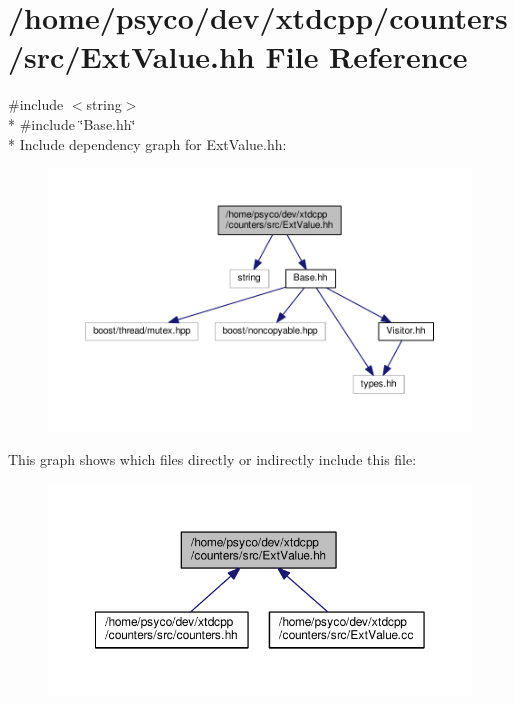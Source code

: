 \hypertarget{ExtValue_8hh}{}\section{/home/psyco/dev/xtdcpp/counters/src/\+Ext\+Value.hh File Reference}
\label{ExtValue_8hh}
{\ttfamily \#include $<$string$>$}\\*
{\ttfamily \#include \char`\"{}Base.\+hh\char`\"{}}\\*
Include dependency graph for Ext\+Value.\+hh\+:
\nopagebreak
\begin{figure}[H]
\begin{center}
\leavevmode
\includegraphics[width=350pt]{ExtValue_8hh__incl}
\end{center}
\end{figure}
This graph shows which files directly or indirectly include this file\+:
\nopagebreak
\begin{figure}[H]
\begin{center}
\leavevmode
\includegraphics[width=350pt]{ExtValue_8hh__dep__incl}
\end{center}
\end{figure}
